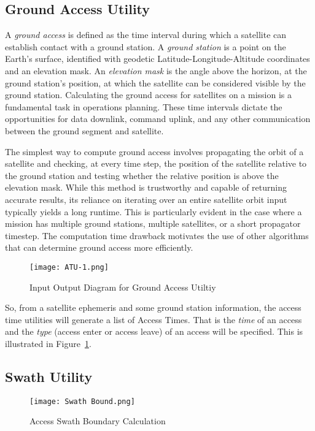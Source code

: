 \subsection{Ground Access Utility}

A \textit{ground access} is defined as the time interval during which a
satellite can establish contact with a ground station. A \textit{ground
station} is a point on the Earth’s surface, identified with geodetic
Latitude-Longitude-Altitude coordinates and an elevation mask. An
\textit{elevation mask} is the angle above the horizon, at the ground station’s
position, at which the satellite can be considered visible by the ground
station. Calculating the ground access for satellites on a mission is a
fundamental task in operations planning. These time intervals dictate the
opportunities for data downlink, command uplink, and any other communication
between the ground segment and satellite.

The simplest way to compute ground access involves propagating the orbit of a
satellite and checking, at every time step, the position of the satellite
relative to the ground station and testing whether the relative position is
above the elevation mask. While this method is trustworthy and capable of
returning accurate results, its reliance on iterating over an entire satellite
orbit input typically yields a long runtime. This is particularly evident in
the case where a mission has multiple ground stations, multiple satellites, or
a short propagator timestep. The computation time drawback motivates the use of
other algorithms that can determine ground access more efficiently.

\begin{figure}[h]
    \centering
    \texttt{[image: ATU-1.png]} 
    \caption{Input Output Diagram for Ground Access Utiltiy}
    \label{fig:atu-1} 
\end{figure}

So, from a satellite ephemeris and some ground station information, the access
time utilities will generate a list of Access Times. That is the \textit{time}
of an access and the \textit{type} (access enter or access leave) of an access
will be specified. This is illustrated in Figure~\ref{fig:atu-1}.

\subsection {Swath Utility}

\begin{figure}
    \centering
    \texttt{[image: Swath Bound.png]} 
    \caption{Access Swath Boundary Calculation}
    \label{fig:swath-bound} 
\end{figure}

